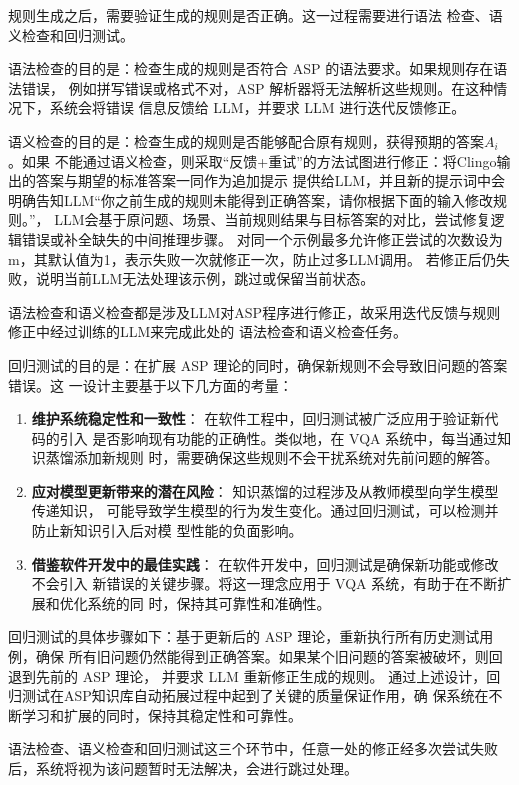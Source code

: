 规则生成之后，需要验证生成的规则是否正确。这一过程需要进行语法
检查、语义检查和回归测试。

语法检查的目的是：检查生成的规则是否符合 ASP 的语法要求。如果规则存在语法错误，
例如拼写错误或格式不对，ASP 解析器将无法解析这些规则。在这种情况下，系统会将错误
信息反馈给 LLM，并要求 LLM 进行迭代反馈修正。

语义检查的目的是：检查生成的规则是否能够配合原有规则，获得预期的答案$A_i$。如果
不能通过语义检查，则采取“反馈+重试”的方法试图进行修正：将Clingo输出的答案与期望的标准答案一同作为追加提示
提供给LLM，并且新的提示词中会明确告知LLM“你之前生成的规则未能得到正确答案，请你根据下面的输入修改规则。”，
LLM会基于原问题、场景、当前规则结果与目标答案的对比，尝试修复逻辑错误或补全缺失的中间推理步骤。
对同一个示例最多允许修正尝试的次数设为m，其默认值为1，表示失败一次就修正一次，防止过多LLM调用。
若修正后仍失败，说明当前LLM无法处理该示例，跳过或保留当前状态。

语法检查和语义检查都是涉及LLM对ASP程序进行修正，故采用迭代反馈与规则修正中经过训练的LLM来完成此处的
语法检查和语义检查任务。

回归测试的目的是：在扩展 ASP 理论的同时，确保新规则不会导致旧问题的答案错误。这
一设计主要基于以下几方面的考量：
\begin{enumerate}[nosep]
\item \textbf{维护系统稳定性和一致性}： 在软件工程中，回归测试被广泛应用于验证新代码的引入
是否影响现有功能的正确性。类似地，在 VQA 系统中，每当通过知识蒸馏添加新规则
时，需要确保这些规则不会干扰系统对先前问题的解答。
\item \textbf{应对模型更新带来的潜在风险}： 知识蒸馏的过程涉及从教师模型向学生模型传递知识，
可能导致学生模型的行为发生变化。通过回归测试，可以检测并防止新知识引入后对模
型性能的负面影响。
\item \textbf{借鉴软件开发中的最佳实践}： 在软件开发中，回归测试是确保新功能或修改不会引入
新错误的关键步骤。将这一理念应用于 VQA 系统，有助于在不断扩展和优化系统的同
时，保持其可靠性和准确性。
\end{enumerate}

回归测试的具体步骤如下：基于更新后的 ASP 理论，重新执行所有历史测试用例，确保
所有旧问题仍然能得到正确答案。如果某个旧问题的答案被破坏，则回退到先前的 ASP 理论，
并要求 LLM 重新修正生成的规则。
通过上述设计，回归测试在ASP知识库自动拓展过程中起到了关键的质量保证作用，确
保系统在不断学习和扩展的同时，保持其稳定性和可靠性。

语法检查、语义检查和回归测试这三个环节中，任意一处的修正经多次尝试失败后，系统将视为该问题暂时无法解决，会进行跳过处理。
